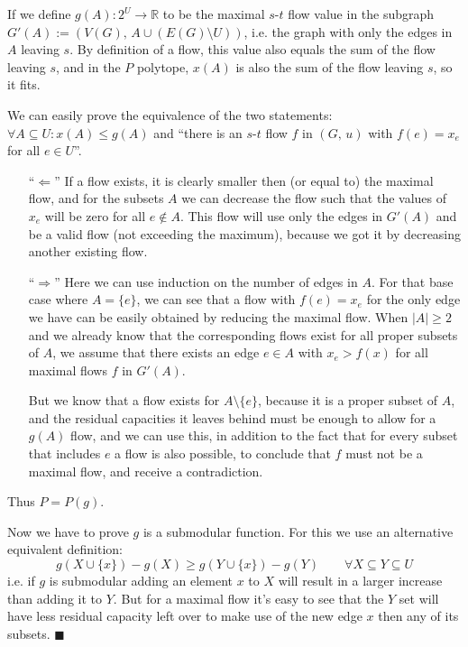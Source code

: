 \documentclass{article}
\newcommand{\R}{\mathbb{R}}
\begin{document}
  If we define $g(A) : 2^U \to \R$ to be the maximal $s$-$t$ flow value in the subgraph $G'(A) := (V(G),\, A \cup (E(G) \setminus U))$,
  i.e. the graph with only the edges in $A$ leaving $s$.
  By definition of a flow, this value also equals the sum of the flow leaving $s$,
  and in the $P$ polytope, $x(A)$ is also the sum of the flow leaving $s$, so it fits.

  We can easily prove the equivalence of the two statements: $\forall A \subseteq U : x(A) \leq g(A)$ and ``there is an $s$-$t$ flow $f$ in $(G,\, u)$ with $f(e) = x_e$ for all $e\in U$''.
  \begin{itemize}
    \item[``$\Leftarrow$''] If a flow exists, it is clearly smaller then (or equal to) the maximal flow,
    and for the subsets $A$ we can decrease the flow such that the values of $x_e$ will be zero for all $e \not\in A$.
    This flow will use only the edges in $G'(A)$ and be a valid flow (not exceeding the maximum),
    because we got it by decreasing another existing flow.

    \item[``$\Rightarrow$''] Here we can use induction on the number of edges in $A$.
    For that base case where $A = \{e\}$, we can see that a flow with $f(e) = x_e$ for the only edge we have can be easily obtained by reducing the maximal flow.
    When $|A| \geq 2$ and we already know that the corresponding flows exist for all proper subsets of $A$,
    we assume that there exists an edge $e \in A$ with $x_e > f(x)$ for all maximal flows $f$ in $G'(A)$.

    But we know that a flow exists for $A \setminus \{e\}$, because it is a proper subset of $A$,
    and the residual capacities it leaves behind must be enough to allow for a $g(A)$ flow,
    and we can use this, in addition to the fact that for every subset that includes $e$ a flow is also possible,
    to conclude that $f$ must not be a maximal flow, and receive a contradiction.
  \end{itemize}
  Thus $P = P(g)$.

  Now we have to prove $g$ is a submodular function.
  For this we use an alternative equivalent definition:
  \[ g(X\cup \{x\}) - g(X) \geq g(Y\cup \{x\}) - g(Y) \qquad \forall X \subseteq Y \subseteq U \]
  i.e. if $g$ is submodular adding an element $x$ to $X$ will result in a larger increase than adding it to $Y$.
  But for a maximal flow it's easy to see that the $Y$ set will have less residual capacity left over to make use of the new edge $x$
  then any of its subsets.
  $\blacksquare$
\end{document}
